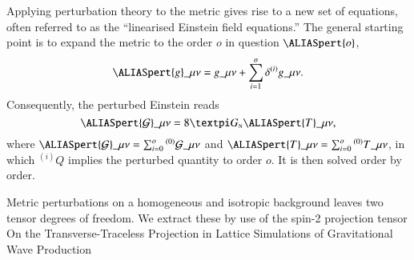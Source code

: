 




% 
\newcommand{\pert}[1]{\ALIASpert{#1}}           %
\newcommand*{\ah}{\ALIASah}                     %
%


Applying perturbation theory to the metric gives rise to a new set of equations, often referred to as the ``linearised Einstein field equations.'' The general starting point is to expand the metric to the order $o$ in question $\pert{o}$, 
\begin{equation}
    \pert{g}\_{\mu\nu} = g\_{\mu\nu}+ \sum_{i=1}^{o} \delta^{(i)}g\_{\mu\nu}.
\end{equation}
Consequently, the perturbed Einstein reads 
\begin{equation}
    \pert{\mathcal{G}}\_{\mu\nu} = 8\ppi G\nped{N} \pert{T}\_{\mu\nu},
\end{equation}
where $\pert{\mathcal{G}}\_{\mu\nu}=\sum_{i=0}^{o} {}^{(0)}\mathcal{G}\_{\mu\nu}$ and $\pert{T}\_{\mu\nu}=\sum_{i=0}^{o} {}^{(0)}T\_{\mu\nu}$, in which ${}^{(i)}Q$ implies the perturbed quantity to order $o$. It is then solved order by order.





Metric perturbations on a homogeneous and isotropic background leaves two tensor degrees of freedom. We extract these by use of the spin-2 projection tensor On the Transverse-Traceless Projection in Lattice
Simulations of Gravitational Wave Production



\hlineSep


